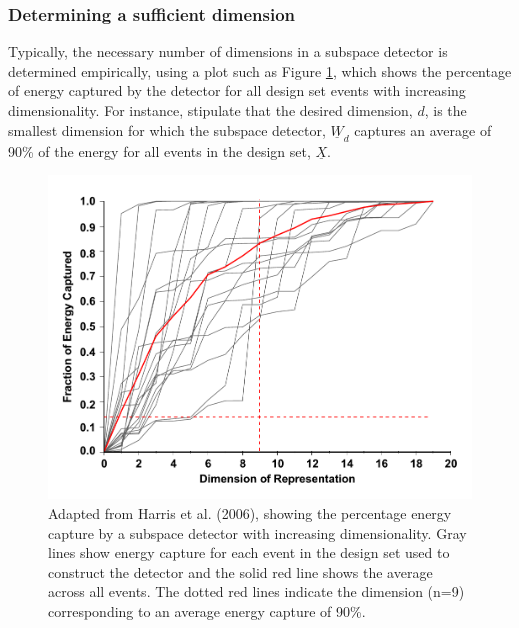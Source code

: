 \subsubsection{Determining a sufficient dimension}
Typically, the necessary number of dimensions in a subspace detector is determined empirically, using a plot such as Figure \ref{425783}, which shows the percentage of energy captured by the detector for all design set events with increasing dimensionality. For instance, \citet{Chambers_2015} stipulate that the desired dimension, $d$, is the smallest dimension for which the subspace detector, $\underline{W}_{d}$ captures an average of 90\% of the energy for all events in the design set, $\underline{X}$.
\begin{figure}[h!]
\begin{center}
\includegraphics[width=0.70\columnwidth]{Chapter_2_Data/figures/Harris_2006_fig8/Harris_2006_fig8_original}
\caption{{Adapted from Harris et al. (2006), showing the percentage energy capture
by a subspace detector with increasing dimensionality. Gray lines show
energy capture for each event in the design set used to construct the
detector and the solid red line shows the average across all events. The
dotted red lines indicate the dimension (n=9) corresponding to an
average energy capture of 90\%.
{\label{425783}}%
}}
\end{center}
\end{figure}